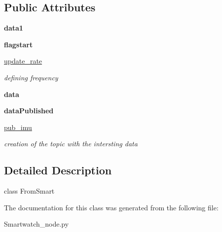\subsection*{Public Attributes}
\begin{DoxyCompactItemize}
\item 
{\bfseries data1}\hypertarget{classSmartwatch__node_1_1Fromsmart_a9191ed73fe4af664c880c76b79ec68b9}{}\label{classSmartwatch__node_1_1Fromsmart_a9191ed73fe4af664c880c76b79ec68b9}

\item 
{\bfseries flagstart}\hypertarget{classSmartwatch__node_1_1Fromsmart_a7940f096e122a79720da8b314a74e988}{}\label{classSmartwatch__node_1_1Fromsmart_a7940f096e122a79720da8b314a74e988}

\item 
\hyperlink{classSmartwatch__node_1_1Fromsmart_a6ee3e1ebd679e70496307898c2dbd390}{update\+\_\+rate}\hypertarget{classSmartwatch__node_1_1Fromsmart_a6ee3e1ebd679e70496307898c2dbd390}{}\label{classSmartwatch__node_1_1Fromsmart_a6ee3e1ebd679e70496307898c2dbd390}

\begin{DoxyCompactList}\small\item\em defining frequency \end{DoxyCompactList}\item 
{\bfseries data}\hypertarget{classSmartwatch__node_1_1Fromsmart_aa02d6526bb377e593efbe3a64ac00ffa}{}\label{classSmartwatch__node_1_1Fromsmart_aa02d6526bb377e593efbe3a64ac00ffa}

\item 
{\bfseries data\+Published}\hypertarget{classSmartwatch__node_1_1Fromsmart_a03c7946d143ce60db1e3fad5fc1637d6}{}\label{classSmartwatch__node_1_1Fromsmart_a03c7946d143ce60db1e3fad5fc1637d6}

\item 
\hyperlink{classSmartwatch__node_1_1Fromsmart_a15e21f550231b29281c85ee49fc6119f}{pub\+\_\+imu}\hypertarget{classSmartwatch__node_1_1Fromsmart_a15e21f550231b29281c85ee49fc6119f}{}\label{classSmartwatch__node_1_1Fromsmart_a15e21f550231b29281c85ee49fc6119f}

\begin{DoxyCompactList}\small\item\em creation of the topic with the intersting data \end{DoxyCompactList}\end{DoxyCompactItemize}


\subsection{Detailed Description}
class From\+Smart 

The documentation for this class was generated from the following file\+:\begin{DoxyCompactItemize}
\item 
Smartwatch\+\_\+node.\+py\end{DoxyCompactItemize}
